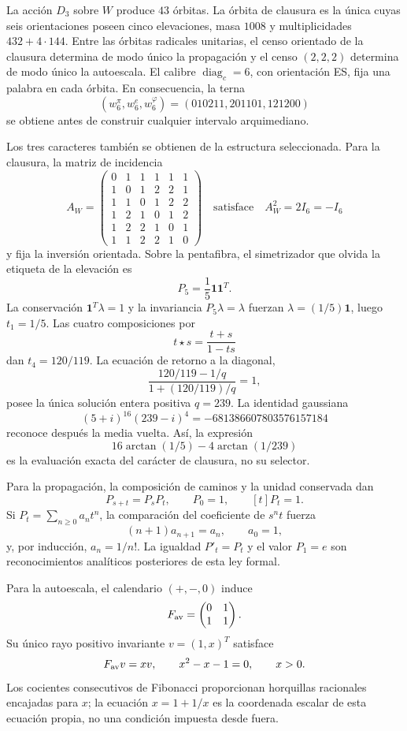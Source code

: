 La acción \(D_3\) sobre \(W\) produce \(43\) órbitas. La órbita de clausura
es la única cuyas seis orientaciones poseen cinco elevaciones, masa \(1008\)
y multiplicidades \(432+4\cdot144\). Entre las órbitas radicales unitarias,
el censo orientado de la clausura determina de modo único la propagación y el
censo \((2,2,2)\) determina de modo único la autoescala. El calibre
\(\operatorname{diag}_c=6\), con orientación ES, fija una palabra en cada
órbita. En consecuencia, la terna
\[
 (w_6^\pi,w_6^e,w_6^\varphi)
 =(010211,201101,121200)
\]
se obtiene antes de construir cualquier intervalo arquimediano.

Los tres caracteres también se obtienen de la estructura seleccionada. Para
la clausura, la matriz de incidencia
\[
 A_W=\begin{pmatrix}
 0&1&1&1&1&1\\
 1&0&1&2&2&1\\
 1&1&0&1&2&2\\
 1&2&1&0&1&2\\
 1&2&2&1&0&1\\
 1&1&2&2&1&0
 \end{pmatrix}
 \quad\text{satisface}\quad A_W^2=2I_6=-I_6
\]
y fija la inversión orientada. Sobre la pentafibra, el simetrizador que
olvida la etiqueta de la elevación es
\[
 P_5=\frac15\mathbf1\mathbf1^T.
\]
La conservación \(\mathbf1^T\lambda=1\) y la invariancia
\(P_5\lambda=\lambda\) fuerzan \(\lambda=(1/5)\mathbf1\), luego
\(t_1=1/5\). Las cuatro
composiciones por
\[
 t\star s=\frac{t+s}{1-ts}
\]
dan \(t_4=120/119\). La ecuación de retorno a la diagonal,
\[
 \frac{120/119-1/q}{1+(120/119)/q}=1,
\]
posee la única solución entera positiva \(q=239\). La identidad gaussiana
\begin{equation}
 \label{eq:generacion-monodromica-identidad-gaussiana-rev7}
 (5+i)^{16}(239-i)^4=-681386607803576157184
\end{equation}
reconoce después la media vuelta. Así, la expresión
\[
 16\arctan(1/5)-4\arctan(1/239)
\]
es la evaluación exacta del carácter de clausura, no su selector.

Para la propagación, la composición de caminos y la unidad conservada dan
\[
 P_{s+t}=P_sP_t,\qquad P_0=1,\qquad [t]P_t=1.
\]
Si \(P_t=\sum_{n\geq0}a_nt^n\), la comparación del coeficiente de \(s^nt\)
fuerza
\[
 (n+1)a_{n+1}=a_n,\qquad a_0=1,
\]
y, por inducción, \(a_n=1/n!\). La igualdad \(P'_t=P_t\) y el valor
\(P_1=e\) son reconocimientos analíticos posteriores de esta ley formal.

Para la autoescala, el calendario \((+,-,0)\) induce
\[
 F_{\rm av}=\begin{pmatrix}0&1\\1&1\end{pmatrix}.
\]
Su único rayo positivo invariante \(v=(1,x)^T\) satisface
\[
 F_{\rm av}v=xv,\qquad x^2-x-1=0,\qquad x>0.
\]
Los cocientes consecutivos de Fibonacci proporcionan horquillas racionales
encajadas para \(x\); la ecuación \(x=1+1/x\) es la coordenada escalar de
esta ecuación propia, no una condición impuesta desde fuera.

